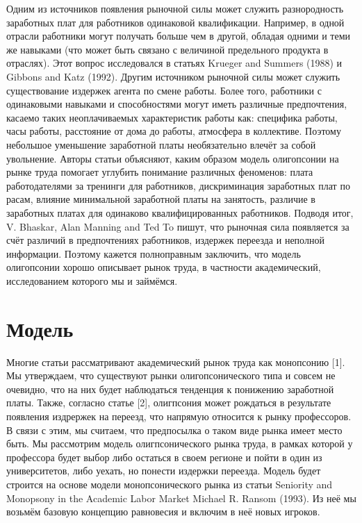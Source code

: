 \documentclass[a4paper, 12pt]{article}
\theoremstyle{definition}
\theoremstyle{plain}
\begin{document}
	Одним из источников появления рыночной силы может служить разнородность заработных плат для работников одинаковой квалификации. Например, в одной отрасли работники могут получать больше чем в другой, обладая одними и теми же навыками (что может быть связано с величиной предельного продукта в отраслях). Этот вопрос исследовался в статьях Krueger and Summers (1988) и Gibbons and Katz (1992).
Другим источником рыночной силы может служить существование издержек агента по смене работы. Более того, работники с одинаковыми навыками и способностями могут иметь различные предпочтения, касаемо таких неоплачиваемых характеристик работы как: специфика работы, часы работы, расстояние от дома до работы, атмосфера в коллективе. Поэтому небольшое уменьшение заработной платы необязательно влечёт за собой увольнение.
Авторы статьи объясняют, каким образом модель олигопсонии на рынке труда помогает углубить понимание различных феноменов: плата работодателями за тренинги для работников, дискриминация заработных плат по расам, влияние минимальной заработной платы на занятость, различие в заработных платах для одинаково квалифицированных работников. Подводя итог, V. Bhaskar, Alan Manning and Ted To пишут, что рыночная сила появляется за счёт различий в предпочтениях работников, издержек переезда и неполной информации. Поэтому кажется полноправным заключить, что модель олигопсонии хорошо описывает рынок труда, в частности академический, исследованием которого мы и займёмся.

\section{Модель}

Многие статьи рассматривают академический рынок труда как монопсонию [1]. Мы утверждаем, что существуют рынки олигопсонического типа и совсем не очевидно, что на них будет наблюдаться тенденция к понижению заработной платы. Также, согласно статье [2], олигпсония может рождаться в результате появления издрержек на переезд, что напрямую относится к рынку профессоров. В связи с этим, мы считаем, что предпосылка о таком виде рынка имеет место быть.  Мы рассмотрим модель олигпсонического рынка труда, в рамках которой у профессора будет выбор либо остаться в своем регионе и пойти в один из университетов, либо уехать, но понести издержки переезда. Модель будет строится на основе модели монопсонического рынка из статьи Seniority and Monopsony in the Academic Labor Market Michael R. Ransom (1993). Из неё мы возьмём базовую концепцию равновесия и включим в неё новых игроков. 
\end{document}
